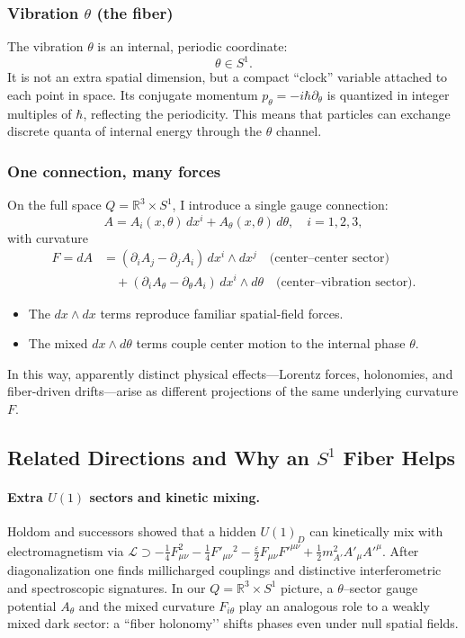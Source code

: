 \subsubsection*{Vibration $\theta$ (the fiber)}
The vibration $\theta$ is an internal, periodic coordinate:
\[
\theta \in S^1 .
\]
It is not an extra spatial dimension, but a compact ``clock'' variable attached to each point in space.
Its conjugate momentum $p_\theta = -i\hbar \partial_\theta$ is quantized in integer multiples of $\hbar$, 
reflecting the periodicity. This means that particles can exchange discrete quanta of internal energy 
through the $\theta$ channel.

\subsubsection*{One connection, many forces}
On the full space $Q = \mathbb{R}^3 \times S^1$, I introduce a single gauge connection:
\begin{equation}
A = A_i(x,\theta)\, dx^i + A_\theta(x,\theta)\, d\theta, \quad i=1,2,3,
\end{equation}
with curvature
\begin{align}
F = dA 
&= (\partial_i A_j - \partial_j A_i)\, dx^i \wedge dx^j \quad \text{(center--center sector)} \\
&\quad + (\partial_i A_\theta - \partial_\theta A_i)\, dx^i \wedge d\theta 
\quad \text{(center--vibration sector)} .
\end{align}

\begin{itemize}
  \item The $dx \wedge dx$ terms reproduce familiar spatial-field forces.
  \item The mixed $dx \wedge d\theta$ terms couple center motion to the internal phase $\theta$.
\end{itemize}

In this way, apparently distinct physical effects---Lorentz forces, holonomies, and 
fiber-driven drifts---arise as different projections of the same underlying curvature $F$.

\subsection{Related Directions and Why an $S^1$ Fiber Helps}
\label{subsec:related}

\paragraph{Extra $U(1)$ sectors and kinetic mixing.}
Holdom and successors showed that a hidden $U(1)_D$ can kinetically mix with electromagnetism via 
$\mathcal{L}\supset -\tfrac{1}{4}F_{\mu\nu}^2 - \tfrac{1}{4}F'_{\mu\nu}{}^2 - \tfrac{\varepsilon}{2}F_{\mu\nu}F'^{\mu\nu}+ \tfrac{1}{2}m_{A'}^2 A'_\mu A'^{\mu}$.
After diagonalization one finds millicharged couplings and distinctive interferometric and spectroscopic signatures.
In our $Q=\mathbb{R}^3\times S^1$ picture, a $\theta$--sector gauge potential $A_\theta$ and the mixed curvature $F_{i\theta}$ play an analogous role to a weakly mixed dark sector: a
``fiber holonomy’’ shifts phases even under null spatial fields.

